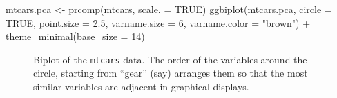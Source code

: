 \documentclass[
  letterpaper,
  10pt,
  krantz2]{krantz}
\makeatletter
\newenvironment{Shaded}{\begin{snugshade}}{\end{snugshade}}
\newcommand{\AttributeTok}[1]{\textcolor[rgb]{0.40,0.45,0.13}{#1}}
\newcommand{\ConstantTok}[1]{\textcolor[rgb]{0.56,0.35,0.01}{#1}}
\newcommand{\DecValTok}[1]{\textcolor[rgb]{0.68,0.00,0.00}{#1}}
\newcommand{\FloatTok}[1]{\textcolor[rgb]{0.68,0.00,0.00}{#1}}
\newcommand{\FunctionTok}[1]{\textcolor[rgb]{0.28,0.35,0.67}{#1}}
\newcommand{\NormalTok}[1]{\textcolor[rgb]{0.00,0.23,0.31}{#1}}
\newcommand{\OtherTok}[1]{\textcolor[rgb]{0.00,0.23,0.31}{#1}}
\newcommand{\SpecialCharTok}[1]{\textcolor[rgb]{0.37,0.37,0.37}{#1}}
\newcommand{\StringTok}[1]{\textcolor[rgb]{0.13,0.47,0.30}{#1}}
\newenvironment{kframe}{%
  \medskip{}
  \setlength{\fboxsep}{.8em}
  \def\at@end@of@kframe{}%
  \ifinner\ifhmode%
  \def\at@end@of@kframe{\end{minipage}}%
  \begin{minipage}{\columnwidth}%
  \fi\fi%
  \def\FrameCommand##1{\hskip\@totalleftmargin \hskip-\fboxsep
  \colorbox{shadecolor}{##1}\hskip-\fboxsep
      \hskip-\linewidth \hskip-\@totalleftmargin \hskip\columnwidth}%
  \MakeFramed {\advance\hsize-\width
    \@totalleftmargin\z@ \linewidth\hsize
    \@setminipage}}%
{\par\unskip\endMakeFramed%
  \at@end@of@kframe}
\renewenvironment{Shaded}{\begin{kframe}}{\end{kframe}}
\makeatother
\begin{document}
\begin{Shaded}
\begin{Highlighting}[]
\NormalTok{mtcars.pca }\OtherTok{\textless{}{-}} \FunctionTok{prcomp}\NormalTok{(mtcars, }\AttributeTok{scale. =} \ConstantTok{TRUE}\NormalTok{)}
\FunctionTok{ggbiplot}\NormalTok{(mtcars.pca,}
         \AttributeTok{circle =} \ConstantTok{TRUE}\NormalTok{,}
         \AttributeTok{point.size =} \FloatTok{2.5}\NormalTok{,}
         \AttributeTok{varname.size =} \DecValTok{6}\NormalTok{,}
         \AttributeTok{varname.color =} \StringTok{"brown"}\NormalTok{) }\SpecialCharTok{+}
  \FunctionTok{theme\_minimal}\NormalTok{(}\AttributeTok{base\_size =} \DecValTok{14}\NormalTok{) }
\end{Highlighting}
\end{Shaded}

\begin{figure}[H]


\caption{\label{fig-mtcars-biplot}Biplot of the \texttt{mtcars} data.
The order of the variables around the circle, starting from ``gear''
(say) arranges them so that the most similar variables are adjacent in
graphical displays.}

\end{figure}%
\end{document}
